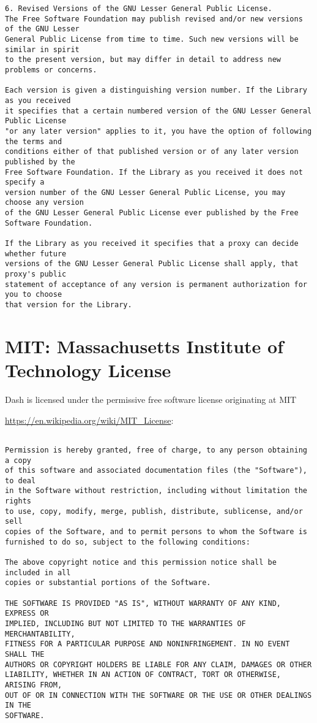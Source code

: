 \begin{verbatim}
6. Revised Versions of the GNU Lesser General Public License.
The Free Software Foundation may publish revised and/or new versions of the GNU Lesser
General Public License from time to time. Such new versions will be similar in spirit
to the present version, but may differ in detail to address new problems or concerns.

Each version is given a distinguishing version number. If the Library as you received
it specifies that a certain numbered version of the GNU Lesser General Public License
"or any later version" applies to it, you have the option of following the terms and
conditions either of that published version or of any later version published by the
Free Software Foundation. If the Library as you received it does not specify a
version number of the GNU Lesser General Public License, you may choose any version
of the GNU Lesser General Public License ever published by the Free Software Foundation.

If the Library as you received it specifies that a proxy can decide whether future
versions of the GNU Lesser General Public License shall apply, that proxy's public
statement of acceptance of any version is permanent authorization for you to choose
that version for the Library.
\end{verbatim}
\normalsize
\section{MIT: Massachusetts Institute of Technology License}

Dash is licensed under the permissive free software license originating at \ac{MIT}

\url{https://en.wikipedia.org/wiki/MIT_License}:
\scriptsize
\begin{verbatim}

Permission is hereby granted, free of charge, to any person obtaining a copy
of this software and associated documentation files (the "Software"), to deal
in the Software without restriction, including without limitation the rights
to use, copy, modify, merge, publish, distribute, sublicense, and/or sell
copies of the Software, and to permit persons to whom the Software is
furnished to do so, subject to the following conditions:

The above copyright notice and this permission notice shall be included in all
copies or substantial portions of the Software.

THE SOFTWARE IS PROVIDED "AS IS", WITHOUT WARRANTY OF ANY KIND, EXPRESS OR
IMPLIED, INCLUDING BUT NOT LIMITED TO THE WARRANTIES OF MERCHANTABILITY,
FITNESS FOR A PARTICULAR PURPOSE AND NONINFRINGEMENT. IN NO EVENT SHALL THE
AUTHORS OR COPYRIGHT HOLDERS BE LIABLE FOR ANY CLAIM, DAMAGES OR OTHER
LIABILITY, WHETHER IN AN ACTION OF CONTRACT, TORT OR OTHERWISE, ARISING FROM,
OUT OF OR IN CONNECTION WITH THE SOFTWARE OR THE USE OR OTHER DEALINGS IN THE
SOFTWARE.

\end{verbatim}
\normalsize
